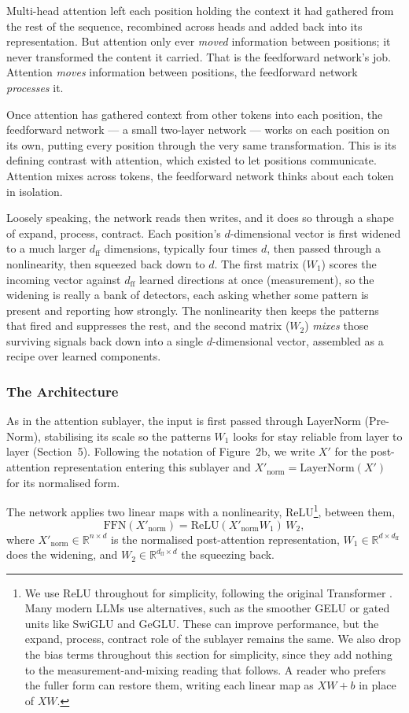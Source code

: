 \documentclass[11pt]{article}
\begin{document}
Multi-head attention left each position holding the context it had gathered from the rest of the sequence, recombined across heads and added back into its representation. But attention only ever \textit{moved} information between positions; it never transformed the content it carried. That is the feedforward network's job. Attention \textit{moves} information between positions, the feedforward network \textit{processes} it.

Once attention has gathered context from other tokens into each position, the feedforward network --- a small two-layer network --- works on each position on its own, putting every position through the very same transformation. This is its defining contrast with attention, which existed to let positions communicate. Attention mixes across tokens, the feedforward network thinks about each token in isolation.

Loosely speaking, the network reads then writes, and it does so through a shape of expand, process, contract. Each position's $d$-dimensional vector is first widened to a much larger $d_{\text{ff}}$ dimensions, typically four times $d$, then passed through a nonlinearity, then squeezed back down to $d$. The first matrix ($W_1$) scores the incoming vector against $d_{\text{ff}}$ learned directions at once (measurement), so the widening is really a bank of detectors, each asking whether some pattern is present and reporting how strongly. The nonlinearity then keeps the patterns that fired and suppresses the rest, and the second matrix ($W_2$) \textit{mixes} those surviving signals back down into a single $d$-dimensional vector, assembled as a recipe over learned components.

\subsubsection*{The Architecture}

As in the attention sublayer, the input is first passed through LayerNorm (Pre-Norm), stabilising its scale so the patterns $W_1$ looks for stay reliable from layer to layer (Section~5). Following the notation of Figure~2b, we write $X'$ for the post-attention representation entering this sublayer and $X'_{\text{norm}} = \text{LayerNorm}(X')$ for its normalised form. 

The network applies two linear maps with a nonlinearity, ReLU\footnote{We use ReLU throughout for simplicity, following the original Transformer \citep{vaswani2017attention}. Many modern LLMs use alternatives, such as the smoother GELU or gated units like SwiGLU and GeGLU. These can improve performance, but the expand, process, contract role of the sublayer remains the same. We also drop the bias terms throughout this section for simplicity, since they add nothing to the measurement-and-mixing reading that follows. A reader who prefers the fuller form can restore them, writing each linear map as $XW + b$ in place of $XW$.}, between them,
\[
\text{FFN}(X'_{\text{norm}}) = \text{ReLU}(X'_{\text{norm}} W_1)\, W_2,
\]
where $X'_{\text{norm}} \in \mathbb{R}^{n \times d}$ is the normalised post-attention representation, $W_1 \in \mathbb{R}^{d \times d_{\text{ff}}}$ does the widening, and $W_2 \in \mathbb{R}^{d_{\text{ff}} \times d}$ the squeezing back.
\end{document}
